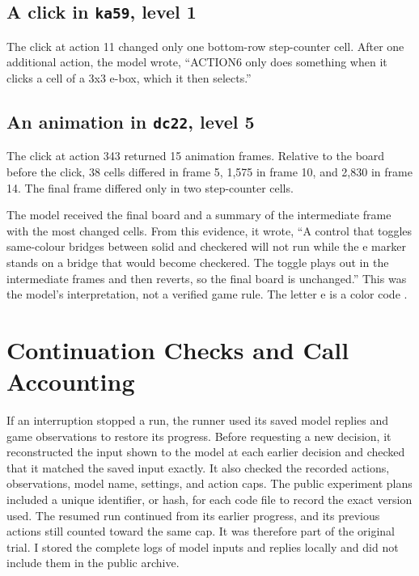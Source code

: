 



\subsection{A click in \texttt{ka59}, level 1}\label{app:ka59-click}
The click at action 11 changed only one bottom-row step-counter cell. After one additional action, the model wrote, ``ACTION6 only does something when it clicks a cell of a 3x3 e-box, which it then selects.''

\subsection{An animation in \texttt{dc22}, level 5}\label{app:dc22-animation}
The click at action 343 returned 15 animation frames. Relative to the board before the click, 38 cells differed in frame 5, 1,575 in frame 10, and 2,830 in frame 14. The final frame differed only in two step-counter cells.

The model received the final board and a summary of the intermediate frame with the most changed cells. From this evidence, it wrote, ``A control that toggles same-colour bridges between solid and checkered will not run while the e marker stands on a bridge that would become checkered. The toggle plays out in the intermediate frames and then reverts, so the final board is unchanged.'' This was the model's interpretation, not a verified game rule. The letter e is a color code \citep{dai2026runfigures}.

\FloatBarrier
\section{Continuation Checks and Call Accounting}\label{app:continuation}
If an interruption stopped a run, the runner used its saved model replies and game observations to restore its progress. Before requesting a new decision, it reconstructed the input shown to the model at each earlier decision and checked that it matched the saved input exactly. It also checked the recorded actions, observations, model name, settings, and action caps. The public experiment plans included a unique identifier, or hash, for each code file to record the exact version used. The resumed run continued from its earlier progress, and its previous actions still counted toward the same cap. It was therefore part of the original trial. I stored the complete logs of model inputs and replies locally and did not include them in the public archive.

